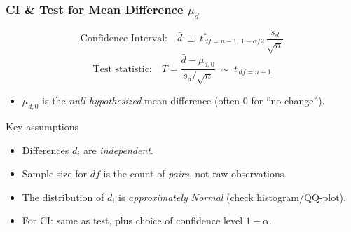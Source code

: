 \documentclass[handout]{beamer}
\begin{document}
\begin{frame}
\frametitle{CI \& Test for Mean Difference \(\mu_d\)}
\[
\text{Confidence Interval:}
\quad
\bar d \;\pm\; t^{\ast}_{\,df=n-1,\,1-\alpha/2}\,\frac{s_d}{\sqrt n}
\]
\[
\text{Test statistic:}
\quad
T = \frac{\bar d - \mu_{d,0}}{s_d/\sqrt n}
\;\sim\; t_{\,df=n-1}
\]
\begin{itemize}
    \item \(\mu_{d,0}\) is the \emph{null hypothesized} mean difference (often 0 for “no change”).
\end{itemize}
\begin{block}{Key assumptions}
\begin{itemize}
  \item Differences \(d_i\) are \emph{independent}.
  \item  Sample size for \(df\) is the count of \emph{pairs}, not raw observations.
  \item The distribution of \(d_i\) is \emph{approximately Normal} (check histogram/QQ‐plot).
  \item For CI: same as test, plus choice of confidence level \(1-\alpha\).
\end{itemize}
\end{block}
\end{frame}
\end{document}
